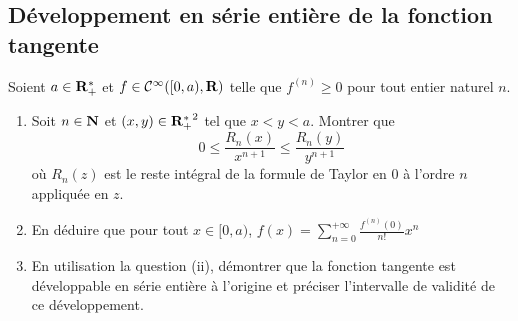 \subsection{Développement en série entière de la fonction tangente}
\begin{exercice}
	Soient $a\in{\mathbf R}_{+}^*$ et $f\in\mathcal C^\infty([0, a),\operatorname{\mathbf{R}})$ telle que $f^{(n)}\geq 0$ pour tout entier naturel $n$.
	\begin{enumerate}
		\item Soit $n\in\operatorname{\mathbf{N}}$ et $(x,y)\in{{\mathbf R}_{+}^*}^2$ tel que $x < y < a$. Montrer que \[0\leq \frac{R_n(x)}{x^{n+1}}\leq \frac{R_n(y)}{y^{n+1}}\]
		où $R_n(z)$ est le reste intégral de la formule de Taylor en $0$ à l'ordre $n$ appliquée en $z$.
		\item En déduire que pour tout $x\in[0,a)$, $f(x)=\sum_{n=0}^{+\infty}\frac{f^{(n)}(0)}{n!}x^n$
		\item En utilisation la question (ii), démontrer que la fonction tangente est développable en série entière à l'origine et préciser l'intervalle de validité de ce développement.
	\end{enumerate}
\end{exercice}

